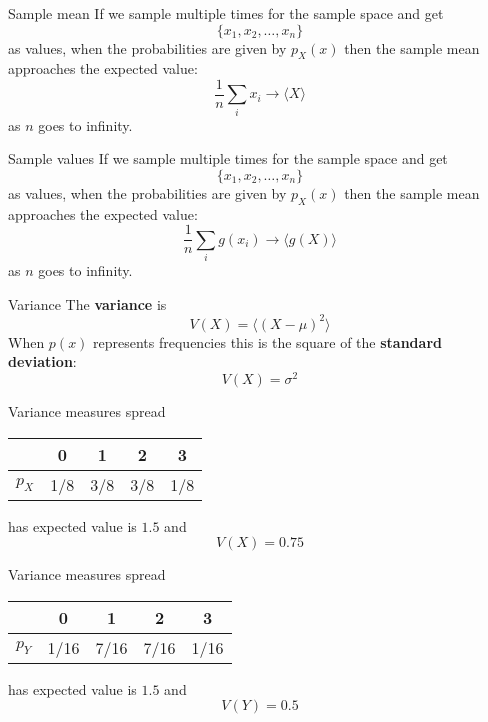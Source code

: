 \documentclass{beamer}
\newcommand{\crish}{\color{reddish}}
\newcommand{\cbla}{\color{black}}
\begin{document}
\begin{frame}{Sample mean}
  If we sample multiple times for the sample space and get
  \crish$$\{x_1,x_2,\ldots,x_n\}$$\cbla{}
  as values, when the probabilities are given by \crish$p_X(x)$\cbla{} then the sample mean approaches the expected value:
  \crish$$
  \frac{1}{n}\sum_i x_i \rightarrow \langle X\rangle
  $$\cbla{}
  as \crish$n$\cbla{} goes to infinity.
\end{frame}


\begin{frame}{Sample values}
  If we sample multiple times for the sample space and get
  \crish$$\{x_1,x_2,\ldots,x_n\}$$\cbla{}
  as values, when the probabilities are given by \crish$p_X(x)$\cbla{} then the sample mean approaches the expected value:
  \crish$$
  \frac{1}{n}\sum_i g(x_i) \rightarrow \langle g(X)\rangle
  $$\cbla{}
  as \crish$n$\cbla{} goes to infinity.
\end{frame}



\begin{frame}{Variance}
  The \textbf{variance} is
\crish$$
V(X)=\langle (X-\mu)^2\rangle
$$\cbla{}
When \crish$p(x)$\cbla{}  represents frequencies this is the square of the
\textbf{standard deviation}:
\crish$$V(X)=\sigma^2$$\cbla{}
\end{frame}

\begin{frame}{Variance measures spread}
\color{purple}
  \begin{center}
\begin{tabular}{c|cccc}
&0&1&2&3\\
\hline
$p_X$&1/8&3/8&3/8&1/8
\end{tabular}
\end{center}
  \cbla{}
  has expected value is \crish$1.5$\cbla{} and
  \crish$$
  V(X)=0.75
  $$\cbla{}
\end{frame}


\begin{frame}{Variance measures spread}
\color{purple}
  \begin{center}
\begin{tabular}{c|cccc}
&0&1&2&3\\
  \hline
  $p_Y$&1/16&7/16&7/16&1/16
\end{tabular}
\end{center}
  \cbla{}
  has expected value is \crish$1.5$\cbla{} and
  \crish$$
  V(Y)=0.5
  $$\cbla{}
\end{frame}
\end{document}
